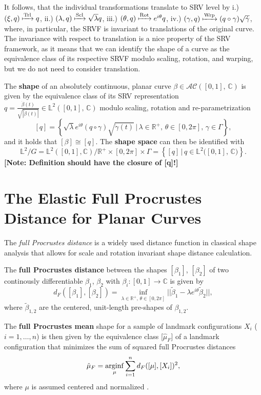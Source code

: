 \noindent It follows, that the individual transformations translate to SRV level by i.) $(\xi, q) \xmapsto{\text{Trl}} q$, ii.) $(\lambda, q) \xmapsto{\text{Scl}} \sqrt\lambda q$, iii.) $(\theta, q) \xmapsto{\text{Rot}} e^{i\theta} q$, iv.) $(\gamma, q) \xmapsto{\text{Wrp}} (q \circ \gamma) \sqrt{\dot\gamma}$, where, in particular, the SRVF is invariant to translations of the original curve.
The invariance with respect to translation is a nice property of the SRV framework, as it means that we can identify the shape of a curve as the equivalence class of its respective SRVF modulo scaling, rotation, and warping, but we do not need to consider translation.
\begin{definition}
  The \textbf{shape} of an absolutely continuous, planar curve $\beta \in \mathcal{AC}([0,1],\, \mathbb{C})$ is given by the equivalence class of its SRV representation $q = \frac{\dot\beta(t)}{\sqrt{|\dot\beta(t)|}} \in \mathbb{L}^2([0,1],\,\mathbb{C})$ modulo scaling, rotation and re-parametrization
  $$[q] = \left\{\sqrt\lambda e^{i\theta}(q \circ \gamma) \sqrt{\dot\gamma(t)} \,|\, \lambda \in \mathbb{R}^+,\, \theta \in [0,2\pi],\, \gamma
  \in \Gamma\right\},$$
  and it holds that $[\beta] \cong [q]$. The \textbf{shape space} can then be identified with 
  $$\mathbb{L}^2 \big/ G = \mathbb{L}^2([0,1], \mathbb{C}) \big/ \mathbb{R}^+ \times [0,2\pi] \times \Gamma = \left\{[q]\,|\,q \in \mathbb{L}^2({[0,1],\,\mathbb{C})}\right\}.$$
  \textbf{[Note: Definition should have the closure of [q]!]}
\end{definition}



\section{The Elastic Full Procrustes Distance for Planar Curves}
\label{theo:proc}
The \textit{full Procrustes distance} is a widely used distance function in
classical shape analysis that allows for scale and rotation invariant shape
distance calculation.
\begin{definition}
  The \textbf{full Procrustes distance} between the shapes $[\beta_1]$,
  $[\beta_2]$ of two continously differentiable $\beta_1$, $\beta_2$ with
  $\beta_i : [0,1] \rightarrow \mathbb{C}$ is given by 
    $$d_F([\beta_1], [\beta_2]) = \inf_{\lambda \in \mathbb{R}^+,\, \theta \in
    [0,2\pi]} ||\tilde{\beta}_1 - \lambda e^{i\theta} \tilde{\beta}_2||, $$
    where $\tilde\beta_{1,2}$ are the centered, unit-length pre-shapes of
    $\beta_{1,2}$.
\end{definition}
\begin{definition}
    The \textbf{full Procrustes mean} shape for a sample of landmark
    configurations $X_i$ ($i = 1,\dots,n$) is then given by the equivalence
    class [$\hat\mu_F$] of a landmark configuration that minimizes the sum of
    squared full Procrustes distances
    $$\hat{\mu}_F = \operatorname*{arginf}_{\mu} \sum_{i=1}^n d_F([\mu], [X_i])^2, $$
    where $\mu$ is assumed centered and normalized
    \parencites[see][71,114]{DrydenMardia2016}.
\end{definition}

